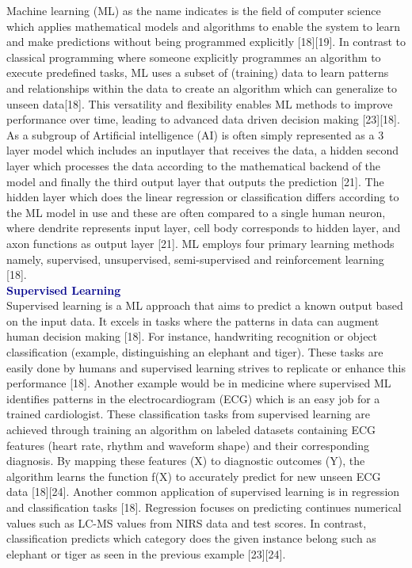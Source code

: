 \documentclass[12pt,a4paper]{report}
\begin{document}
Machine learning (ML) as the name indicates is the field of computer science which applies mathematical models and algorithms to enable the system to learn and make predictions without being programmed explicitly [18][19]. In contrast to classical programming where someone explicitly programmes an algorithm to execute predefined tasks,
ML uses a subset of (training) data to learn patterns and relationships within the data to create an algorithm which can generalize to unseen data[18]. This versatility and flexibility enables ML methods to improve performance over time, leading to advanced data driven decision making [23][18]. As a subgroup of Artificial intelligence (AI)
is often simply represented as a 3 layer model which includes an inputlayer that receives the data, a hidden second layer which processes the data according to the mathematical backend of the model and finally the third output layer that outputs the prediction [21]. The hidden layer which does the linear regression or classification differs 
according to the ML model in use and these are often compared to a single human neuron, where dendrite represents input layer, cell body corresponds to hidden layer, and axon functions as output layer [21]. ML employs four primary learning methods namely, supervised, unsupervised, semi-supervised and reinforcement learning [18]. \\

\textbf{\textcolor{darkblue}{Supervised Learning}}\\
Supervised learning is a ML approach that aims to predict a known output  based on the input data. It excels in tasks where the patterns in data can augment human decision making [18]. 
For instance, handwriting recognition or object classification (example, distinguishing an elephant and tiger). These tasks are easily done by humans and supervised learning strives to replicate 
or enhance this performance [18]. Another example would be in medicine where supervised ML identifies patterns in the electrocardiogram (ECG) which is an easy job for a trained cardiologist. 
These classification tasks from supervised learning are achieved through training an algorithm on labeled datasets containing ECG features (heart rate, rhythm and waveform shape) and their corresponding diagnosis. 
By mapping these features (X) to diagnostic outcomes (Y), the algorithm learns the function f(X) to accurately predict for new unseen ECG data [18][24]. Another common application of supervised learning is in regression and classification tasks [18]. 
Regression focuses on predicting continues numerical values such as LC-MS values from NIRS data and test scores. In contrast, classification predicts which category does the given instance belong such as elephant or tiger as seen in the previous example [23][24]. \\
\end{document}
